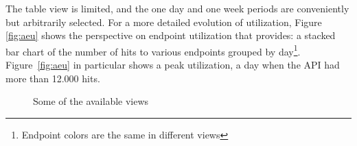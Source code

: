 




The table view is limited, and the one day and one week periods are conveniently but arbitrarily selected. For a more detailed evolution of utilization, Figure \ref{fig:aeu} shows the  perspective on endpoint utilization that \tool provides: a stacked bar chart of the number of hits to various endpoints grouped by day\footnote{Endpoint colors are the same in different views}. Figure~\ref{fig:aeu} in particular shows a peak utilization, a day when the API had more than 12.000 hits. 

\begin{figure}[h!]
  \centering
  \caption{Some of the available views\label{fig:views}}
\end{figure}






